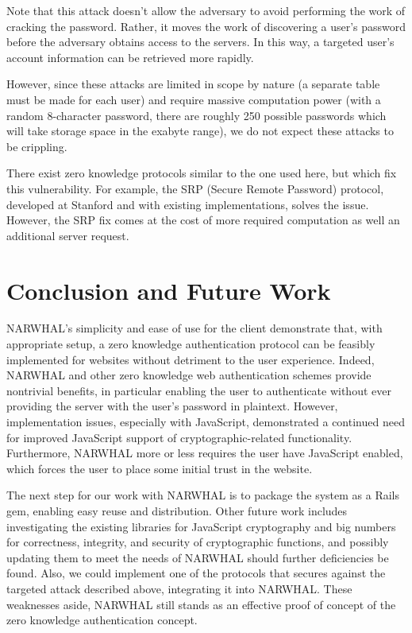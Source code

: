\documentclass[11pt]{article}
\begin{document}
Note that this attack doesn’t allow the adversary to avoid performing the work of cracking the password.  Rather, it moves the work of discovering a user’s password before the adversary obtains access to the servers.  In this way, a targeted user’s account information can be retrieved more rapidly.

However, since these attacks are limited in scope by nature (a separate table must be made for each user) and require massive computation power (with a random 8-character password, there are roughly 250 possible passwords which will take storage space in the exabyte range), we do not expect these attacks to be crippling.

There exist zero knowledge protocols similar to the one used here, but which fix this vulnerability.  For example, the SRP (Secure Remote Password) protocol, developed at Stanford and with existing implementations, solves the issue.  However, the SRP fix comes at the cost of more required computation as well an additional server request. 

\section{Conclusion and Future Work}

NARWHAL’s simplicity and ease of use for the client demonstrate that, with appropriate setup, a zero knowledge authentication protocol can be feasibly implemented for websites without detriment to the user experience.  Indeed, NARWHAL and other zero knowledge web authentication schemes provide nontrivial benefits, in particular enabling the user to authenticate without ever providing the server with the user’s password in plaintext.  However, implementation issues, especially with JavaScript, demonstrated a continued need for improved JavaScript support of cryptographic-related functionality.  Furthermore, NARWHAL more or less requires the user have JavaScript enabled, which forces the user to place some initial trust in the website.

The next step for our work with NARWHAL is to package the system as a Rails gem, enabling easy reuse and distribution.  Other future work includes investigating the existing libraries for JavaScript cryptography and big numbers for correctness, integrity, and security of cryptographic functions, and possibly updating them to meet the needs of NARWHAL should further deficiencies be found.  Also, we could implement one of the protocols that secures against the targeted attack described above, integrating it into NARWHAL. These weaknesses aside, NARWHAL still stands as an effective proof of concept of the zero knowledge authentication concept.
\end{document}
